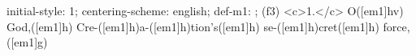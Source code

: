 initial-style: 1;
centering-scheme: english;
def-m1: \grealign;
(f3) <c>1.</c> O([em1]hv) God,([em1]h) Cre-([em1]h)a-([em1]h)tion's([em1]h) se-([em1]h)cret([em1]h) force,([em1]g)